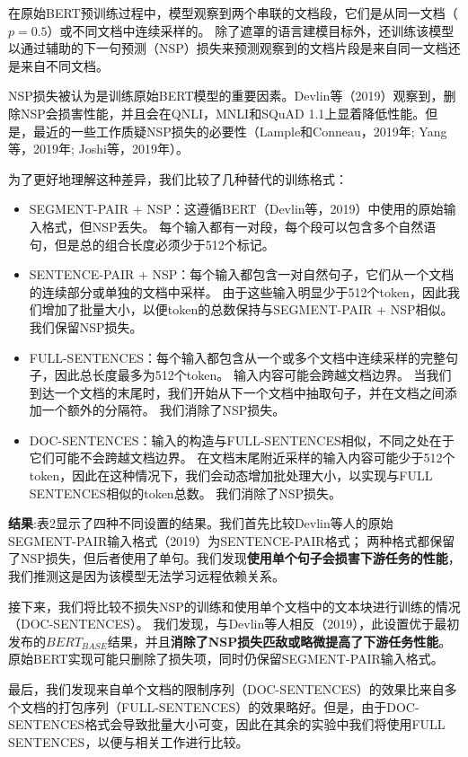 \documentclass[lang=cn,11pt,a4paper,twocolumn]{elegantpaper}
\begin{document}
在原始BERT预训练过程中，模型观察到两个串联的文档段，它们是从同一文档（
$p = 0.5$）或不同文档中连续采样的。 除了遮罩的语言建模目标外，还训练该模型以通过辅助的下一句预测（NSP）损失来预测观察到的文档片段是来自同一文档还是来自不同文档。

NSP损失被认为是训练原始BERT模型的重要因素。Devlin等（2019）观察到，删除NSP会损害性能，并且会在QNLI，MNLI和SQuAD 1.1上显着降低性能。但是，最近的一些工作质疑NSP损失的必要性（Lample和Conneau，2019年; Yang等，2019年; Joshi等，2019年）。

为了更好地理解这种差异，我们比较了几种替代的训练格式：

\begin{itemize}
  \item SEGMENT-PAIR + NSP：这遵循BERT（Devlin等，2019）中使用的原始输入格式，但NSP丢失。 每个输入都有一对段，每个段可以包含多个自然语句，但是总的组合长度必须少于512个标记。
  \item SENTENCE-PAIR + NSP：每个输入都包含一对自然句子，它们从一个文档的连续部分或单独的文档中采样。 由于这些输入明显少于512个token，因此我们增加了批量大小，以便token的总数保持与SEGMENT-PAIR + NSP相似。 我们保留NSP损失。
  \item FULL-SENTENCES：每个输入都包含从一个或多个文档中连续采样的完整句子，因此总长度最多为512个token。 输入内容可能会跨越文档边界。 当我们到达一个文档的末尾时，我们开始从下一个文档中抽取句子，并在文档之间添加一个额外的分隔符。 我们消除了NSP损失。
  \item DOC-SENTENCES：输入的构造与FULL-SENTENCES相似，不同之处在于它们可能不会跨越文档边界。  在文档末尾附近采样的输入内容可能少于512个token，因此在这种情况下，我们会动态增加批处理大小，以实现与FULL SENTENCES相似的token总数。 我们消除了NSP损失。
\end{itemize}

\textbf{结果}:表2显示了四种不同设置的结果。我们首先比较Devlin等人的原始SEGMENT-PAIR输入格式（2019）为SENTENCE-PAIR格式； 两种格式都保留了NSP损失，但后者使用了单句。我们发现\textbf{使用单个句子会损害下游任务的性能}，我们推测这是因为该模型无法学习远程依赖关系。

接下来，我们将比较不损失NSP的训练和使用单个文档中的文本块进行训练的情况（DOC-SENTENCES）。 我们发现，与Devlin等人相反（2019），此设置优于最初发布的$BERT_{BASE}$结果，并且\textbf{消除了NSP损失匹敌或略微提高了下游任务性能}。原始BERT实现可能只删除了损失项，同时仍保留SEGMENT-PAIR输入格式。

最后，我们发现来自单个文档的限制序列（DOC-SENTENCES）的效果比来自多个文档的打包序列（FULL-SENTENCES）的效果略好。但是，由于DOC-SENTENCES格式会导致批量大小可变，因此在其余的实验中我们将使用FULL SENTENCES，以便与相关工作进行比较。
\end{document}
